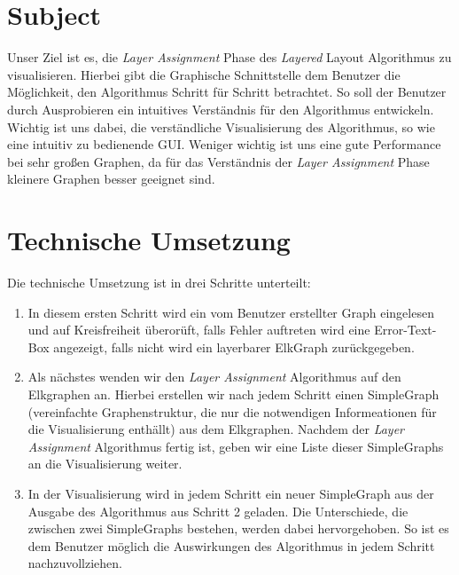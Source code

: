 \documentclass[12pt]{book}
\begin{document}
    
    \section*{Subject}
    
    Unser Ziel ist es, die  \textit{Layer Assignment} Phase des \textit{Layered} Layout Algorithmus zu visualisieren. 
    Hierbei gibt die Graphische Schnittstelle dem Benutzer die Möglichkeit, den Algorithmus Schritt für Schritt betrachtet. 
    So soll der Benutzer durch Ausprobieren ein intuitives Verständnis für den Algorithmus entwickeln. Wichtig ist uns
    dabei, die verständliche Visualisierung des Algorithmus, so wie eine intuitiv zu bedienende GUI. Weniger wichtig ist
    uns eine gute Performance bei sehr großen Graphen, da für das Verständnis der \textit{Layer Assignment} Phase kleinere Graphen besser geeignet sind.
    
    
    
    \section*{Technische Umsetzung}
    
    Die technische Umsetzung ist in drei Schritte unterteilt:
    
    \begin{enumerate}
        \item In diesem ersten Schritt wird ein vom Benutzer erstellter Graph eingelesen und auf Kreisfreiheit überorüft,
        falls Fehler auftreten wird eine Error-Text-Box angezeigt, falls nicht wird ein layerbarer ElkGraph zurückgegeben.
        \item Als nächstes wenden wir den \textit{Layer Assignment} Algorithmus auf den Elkgraphen an. Hierbei erstellen wir nach
        jedem Schritt einen SimpleGraph (vereinfachte Graphenstruktur, die nur die notwendigen Informeationen für die
        Visualisierung enthällt) aus dem Elkgraphen. Nachdem der \textit{Layer Assignment} Algorithmus fertig ist, geben wir 
        eine Liste dieser SimpleGraphs an die Visualisierung weiter.
        \item In der Visualisierung wird in jedem Schritt ein neuer SimpleGraph aus der Ausgabe des Algorithmus aus Schritt 2 geladen. Die Unterschiede, die zwischen zwei SimpleGraphs bestehen, werden dabei hervorgehoben. So ist es dem Benutzer möglich die Auswirkungen des Algorithmus in jedem Schritt nachzuvollziehen.
    \end{enumerate}
    
\end{document}

